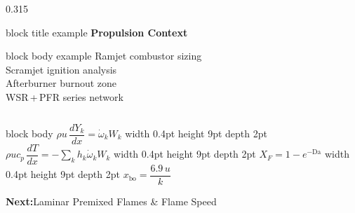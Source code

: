 \documentclass[12pt,aspectratio=169]{beamer}
\begin{document}
{\begin{frame}[plain, c]
\begin{columns}[t, totalwidth=\textwidth]
    \begin{column}{0.315\textwidth}
      \begin{beamercolorbox}[rounded=true, wd=\linewidth,
                             sep=6pt, center]{block title example}
        \textbf{\small Propulsion Context}
      \end{beamercolorbox}
      \vspace{3pt}
      \begin{beamercolorbox}[rounded=true, wd=\linewidth,
                             sep=6pt, center]{block body example}
        \color{black}\fontsize{7.5}{10}\selectfont
        Ramjet combustor sizing\\[3pt]
        Scramjet ignition analysis\\[3pt]
        Afterburner burnout zone\\[3pt]
        WSR\,+\,PFR series network
      \end{beamercolorbox}
    \end{column}
 
  \end{columns}
 
  \vspace{0.30cm}
 
  \begin{beamercolorbox}[rounded=true, wd=\textwidth,
                         sep=5pt, center]{block body}
    \color{skyblue!80}\fontsize{7.8}{10}\selectfont
    $\rho u\,\dfrac{dY_k}{dx} = \dot{\omega}_k W_k$
    \qquad\vrule width 0.4pt height 9pt depth 2pt\qquad
    $\rho u c_p\,\dfrac{dT}{dx} = -\displaystyle\sum_k h_k\dot{\omega}_k W_k$
    \qquad\vrule width 0.4pt height 9pt depth 2pt\qquad
    $X_F = 1 - e^{-\mathrm{Da}}$
    \qquad\vrule width 0.4pt height 9pt depth 2pt\qquad
    $x_{\text{bo}} = \dfrac{6.9\,u}{k}$
  \end{beamercolorbox}
 
  \vspace{0.22cm}
 
  \begin{center}
    {\color{white!50}\fontsize{7.5}{9}\selectfont
     \textbf{Next:}\enspace Laminar Premixed Flames \& Flame Speed}
  \end{center}
 
\end{frame}
}

\end{document}
